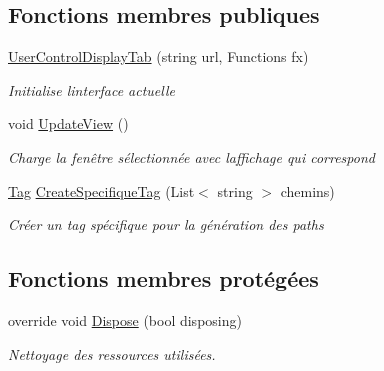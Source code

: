 \subsection*{Fonctions membres publiques}
\begin{DoxyCompactItemize}
\item 
\mbox{\hyperlink{class_m_t_connect_agent_1_1_user_control_display_tab_a75f993d745781ea932a201f00bbe150e}{User\+Control\+Display\+Tab}} (string url, Functions fx)
\begin{DoxyCompactList}\small\item\em Initialise l\textquotesingle{}interface actuelle \end{DoxyCompactList}\item 
void \mbox{\hyperlink{class_m_t_connect_agent_1_1_user_control_display_tab_abcf66374bf792fe271d968bb035d749d}{Update\+View}} ()
\begin{DoxyCompactList}\small\item\em Charge la fenêtre sélectionnée avec l\textquotesingle{}affichage qui correspond \end{DoxyCompactList}\item 
\mbox{\hyperlink{class_m_t_connect_agent_1_1_model_1_1_tag}{Tag}} \mbox{\hyperlink{class_m_t_connect_agent_1_1_user_control_display_tab_a97ab71f68df06c33f0420131314c8a68}{Create\+Specifique\+Tag}} (List$<$ string $>$ chemins)
\begin{DoxyCompactList}\small\item\em Créer un tag spécifique pour la génération des paths \end{DoxyCompactList}\end{DoxyCompactItemize}
\subsection*{Fonctions membres protégées}
\begin{DoxyCompactItemize}
\item 
override void \mbox{\hyperlink{class_m_t_connect_agent_1_1_user_control_display_tab_a0cfe1921bf9282de4c87b7b3c68bf6e6}{Dispose}} (bool disposing)
\begin{DoxyCompactList}\small\item\em Nettoyage des ressources utilisées. \end{DoxyCompactList}\end{DoxyCompactItemize}
